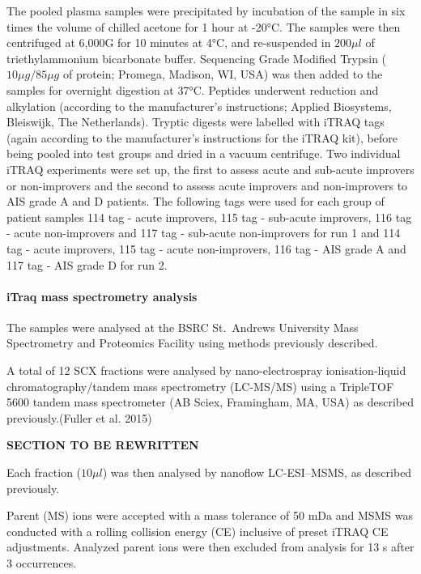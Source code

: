 \documentclass[9pt,lineno]{elife}
\begin{document}
The pooled plasma samples were precipitated by incubation of the sample in six times the volume of chilled acetone for 1 hour at -20°C.
The samples were then centrifuged at 6,000G for 10 minutes at 4°C, and re-suspended in \(200\mu l\) of triethylammonium bicarbonate buffer.
Sequencing Grade Modified Trypsin (\(10\mu g/85\mu g\) of protein; Promega, Madison, WI, USA) was then added to the samples for overnight digestion at 37°C.
Peptides underwent reduction and alkylation (according to the manufacturer's instructions; Applied Biosystems, Bleiswijk, The Netherlands).
Tryptic digests were labelled with iTRAQ tags (again according to the manufacturer's instructions for the iTRAQ kit), before being pooled into test groups and dried in a vacuum centrifuge.
Two individual iTRAQ experiments were set up, the first to assess acute and sub-acute improvers or non-improvers and the second to assess acute improvers and non-improvers to AIS grade A and D patients.
The following tags were used for each group of patient samples 114 tag - acute improvers, 115 tag - sub-acute improvers, 116 tag - acute non-improvers and 117 tag - sub-acute non-improvers for run 1 and 114 tag - acute improvers, 115 tag - acute non-improvers, 116 tag - AIS grade A and 117 tag - AIS grade D for run 2.

\hypertarget{itraq-mass-spectrometry-analysis}{%
\paragraph{iTraq mass spectrometry analysis}\label{itraq-mass-spectrometry-analysis}}

The samples were analysed at the BSRC St.~Andrews University Mass Spectrometry and Proteomics Facility using methods previously described.

A total of 12 SCX fractions were analysed by nano-electrospray ionisation-liquid chromatography/tandem mass spectrometry (LC-MS/MS) using a TripleTOF 5600 tandem mass spectrometer (AB Sciex, Framingham, MA, USA) as described previously.(Fuller et al. 2015)

\textbf{SECTION TO BE REWRITTEN}

Each fraction (\(10 \mu l\)) was then analysed by nanoflow LC-ESI--MSMS, as described previously.

Parent (MS) ions were accepted with a mass tolerance of 50 mDa and MSMS was conducted with a rolling collision energy (CE) inclusive of preset iTRAQ CE adjustments.
Analyzed parent ions were then excluded from analysis for 13 s after 3 occurrences.
\end{document}
